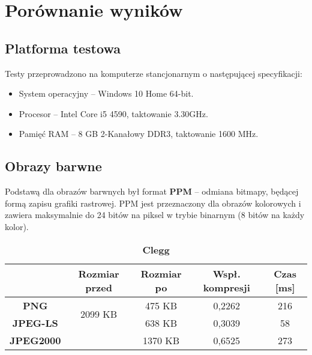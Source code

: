 \section{Porównanie wyników}

\subsection{Platforma testowa}

Testy przeprowadzono na komputerze stancjonarnym o następującej specyfikacji:

\begin{itemize}
	\item System operacyjny -- Windows 10 Home 64-bit.
	\item Procesor -- Intel Core i5 4590, taktowanie 3.30GHz.
	\item Pamięć RAM -- 8 GB 2-Kanałowy DDR3, taktowanie 1600 MHz.
\end{itemize}

\subsection{Obrazy barwne}

Podstawą dla obrazów barwnych był format \textbf{PPM} -- odmiana bitmapy, będącej formą zapisu grafiki rastrowej. PPM jest przeznaczony dla obrazów kolorowych i zawiera maksymalnie do 24 bitów na piksel w trybie binarnym (8 bitów na każdy kolor).

\begin{table}[!h]
	\centering
	\caption{\textbf{Clegg}}
	\label{my-label}
	\begin{tabular}{|c|c|c|c|c|}                                             
		\hline
		& \textbf{Rozmiar przed} & \textbf{Rozmiar po} & \textbf{Wspł. kompresji} & \textbf{Czas {[}ms{]}} \\ \hline 
		\textbf{PNG}      &          \multicolumn{1}{c|}{\multirow{2}{*}{2099 KB}}             &      475 KB               &         0,2262                 &              216               \\\cline{3-5}
		\textbf{JPEG-LS}  &                        &        638  KB         &      0,3039                  &         58                 \\\cline{3-5}
		\textbf{JPEG2000} &                        &        1370 KB             &       0,6525                   &        273              \\ \hline
	\end{tabular}
\end{table}

